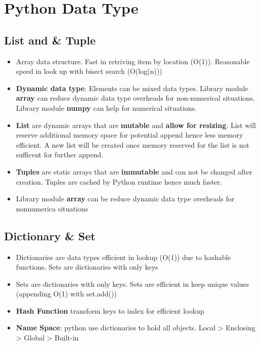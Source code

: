 \documentclass{article}
\begin{document}
\section{Python Data Type}
	
	\subsection{List and \& Tuple}
		\begin{itemize}
			\item Array data structure. Fast in retriving item by location (O(1)). Reasonable speed in look up with bisect search (O(log(n))) 
			\item {\bf Dynamic data type}: Elements can be mixed data types. Library module {\bf array} can reduce dynamic data type overheads for non-numerical situations. Library module {\bf numpy} can help for numerical situations.
			\item {\bf List} are dynamic arrays that are {\bf mutable} and {\bf allow for resizing}. List will reserve additional memory space for potential append hence less memory efficient. A new list will be created once memory reserved for the list is not sufficent for further append.
			\item {\bf Tuples} are static arrays that are {\bf immutable} and can not be changed after creation. Tuples are cached by Python runtime hence much faster.
			\item Library module {\bf array} can be reduce dynamic data type overheads for nonnumerica situations
		\end{itemize}
	
	\subsection{Dictionary \& Set}
		\begin{itemize}
			\item Dictionaries are data types efficient in lookup (O(1)) due to hashable functions. Sets are dictionaries with only keys
			\item Sets are dictionaries with only keys. Sets are efficient in keep unique values (appending O(1) with set.add())
			\item {\bf Hash Function} transform keys to index for efficient lookup
			\item {\bf Name Space}: python use dictionaries to hold all objects. Local > Enclosing > Global > Built-in
		\end{itemize}
\end{document}
